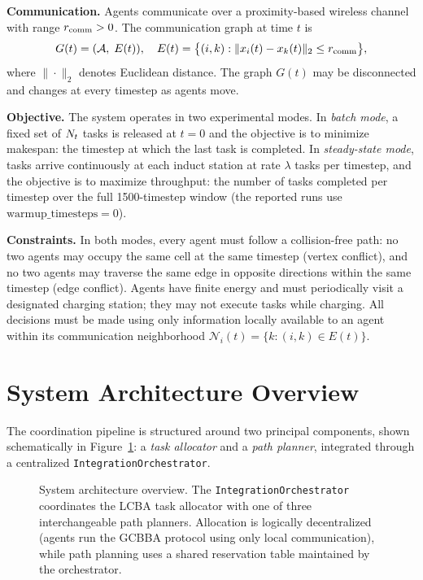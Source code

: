 \textbf{Communication.}
Agents communicate over a proximity-based wireless channel with range
$r_{\text{comm}} > 0$.
The communication graph at time $t$ is
\begin{equation}
  G(t) = (\mathcal{A},\; E(t)),
  \quad
  E(t) = \bigl\{(i,k) : \|x_i(t) - x_k(t)\|_2 \leq r_{\text{comm}}\bigr\},
  \label{eq:comm_graph}
\end{equation}
where $\|\cdot\|_2$ denotes Euclidean distance.
The graph $G(t)$ may be disconnected and changes at every timestep as agents
move.

\textbf{Objective.}
The system operates in two experimental modes.
In \emph{batch mode}, a fixed set of $N_t$ tasks is released at $t = 0$ and
the objective is to minimize makespan: the timestep at which the last task is
completed.
In \emph{steady-state mode}, tasks arrive continuously at each induct station at
rate $\lambda$ tasks per timestep, and the objective is to maximize throughput:
the number of tasks completed per timestep over the full 1500-timestep window
(the reported runs use $\text{warmup\_timesteps} = 0$).

\textbf{Constraints.}
In both modes, every agent must follow a collision-free path:
no two agents may occupy the same cell at the same timestep (vertex conflict),
and no two agents may traverse the same edge in opposite directions within the
same timestep (edge conflict).
Agents have finite energy and must periodically visit a designated charging
station; they may not execute tasks while charging.
All decisions must be made using only information locally available to an agent
within its communication neighborhood $\mathcal{N}_i(t) = \{k : (i,k) \in E(t)\}$.


\section{System Architecture Overview}
\label{sec:method_overview}

The coordination pipeline is structured around two principal components, shown
schematically in Figure~\ref{fig:system_architecture}: a \emph{task allocator}
and a \emph{path planner}, integrated through a centralized
\texttt{IntegrationOrchestrator}.

\begin{figure}[htbp]
  \centering
  \hspace{-4.5cm}%
  \resizebox{\textwidth}{!}{%
  }
  \caption{System architecture overview. The \texttt{IntegrationOrchestrator}
           coordinates the LCBA task allocator with one of three interchangeable
           path planners. Allocation is logically decentralized (agents run
           the GCBBA protocol using only local communication), while path
           planning uses a shared reservation table maintained by the
           orchestrator.}
  \label{fig:system_architecture}
\end{figure}

